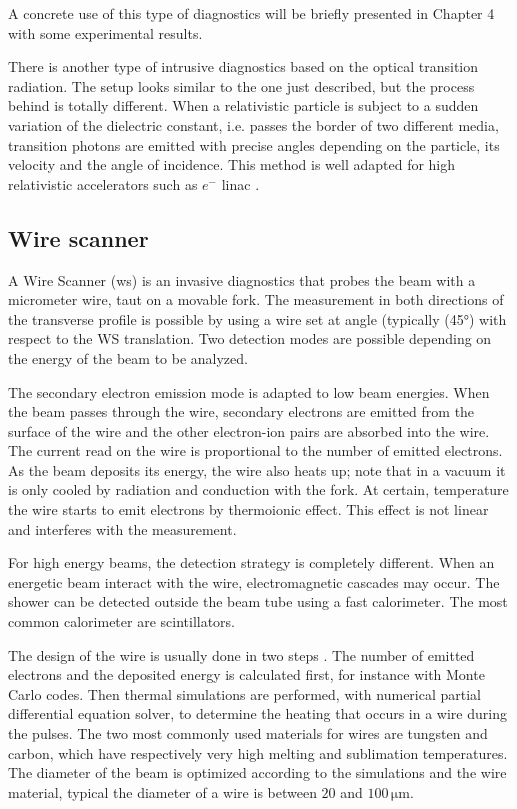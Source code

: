 \begin{refsection}
  A concrete use of this type of diagnostics will be briefly presented in Chapter 4 with some experimental results.

  There is another type of intrusive diagnostics based on the optical transition radiation. The setup looks similar to the one just described, but the process behind is totally different. When a relativistic particle is subject to a sudden variation of the dielectric constant, i.e. passes the border of two different media, transition photons are emitted with precise angles depending on the particle, its velocity and the angle of incidence. This method is well adapted for high relativistic accelerators such as $e^{-}$ \acrshort{linac} \cite{Nolle2009,Bolzon2013}.

  \subsection{Wire scanner}
  A Wire Scanner (\acrshort{ws}) is an invasive diagnostics that probes the beam with a micrometer wire, taut on a movable fork. The measurement in both directions of the transverse profile is possible by using a wire set at angle (typically (45°) with respect to the WS translation. Two detection modes are possible depending on the energy of the beam to be analyzed.

  The secondary electron emission mode is adapted to low beam energies. When the beam passes through the wire, secondary electrons are emitted from the surface of the wire and the other electron-ion pairs are absorbed into the wire. The current read on the wire is proportional to the number of emitted electrons. As the beam deposits its energy, the wire also heats up; note that in a vacuum it is only cooled by radiation and conduction with the fork. At certain, temperature the wire starts to emit electrons by thermoionic effect. This effect is not linear and interferes with the measurement.

  For high energy beams, the detection strategy is completely different. When an energetic beam interact with the wire, electromagnetic cascades may occur. The shower can be detected outside the beam tube using a fast calorimeter. The most common calorimeter are scintillators.%

  The design of the wire is usually done in two steps \cite{Cheymol:LINAC2014-MOPP036}. The number of emitted electrons and the deposited energy is calculated first, for instance with Monte Carlo codes. Then thermal simulations are performed, with numerical partial differential equation solver, to determine the heating that occurs in a wire during the pulses. The two most commonly used materials for wires are tungsten and carbon, which have respectively very high melting and sublimation temperatures. The diameter of the beam is optimized according to the simulations and the wire material, typical the diameter of a wire is between $20$ and $100\,\mathrm{\mu m}$.


\end{refsection}
